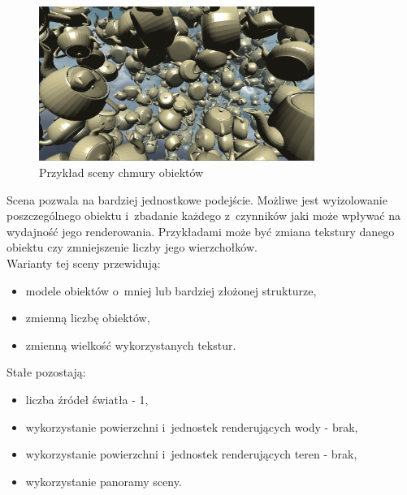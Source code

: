 \documentclass[a4paper,twoside,12pt]{book}
\begin{document}
\begin{figure}[H]
    \centering
    \includegraphics[width=0.8\textwidth]{res/scene2_example.png}
    \caption{Przykład sceny chmury obiektów}
    \label{fig:scene2_example}
\end{figure}

Scena pozwala na bardziej jednostkowe podejście. Możliwe jest wyizolowanie poszczególnego obiektu i~zbadanie każdego z~czynników jaki może wpływać na wydajność jego renderowania. Przykładami może być zmiana tekstury danego obiektu czy zmniejszenie liczby jego wierzchołków. \\
Warianty tej sceny przewidują:
\begin{itemize}
    \item modele obiektów o~mniej lub bardziej złożonej strukturze,
    \item zmienną liczbę obiektów,
    \item zmienną wielkość wykorzystanych tekstur.
\end{itemize}

\vbox{}

Stałe pozostają:
\begin{itemize}
    \item liczba źródeł światła - 1,
    \item wykorzystanie powierzchni i~jednostek renderujących wody - brak,
    \item wykorzystanie powierzchni i~jednostek renderujących teren - brak,
    \item wykorzystanie panoramy sceny.
\end{itemize}
\end{document}

